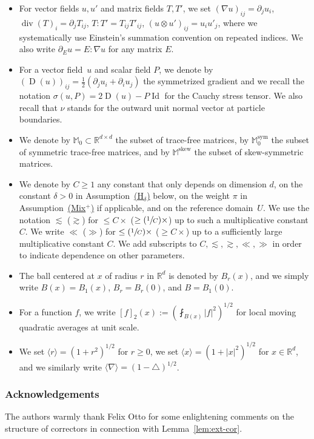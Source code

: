 \documentclass[JEP,XML,SOM,Unicode,published]{cedram}
\newcommand{\Hd}{\hyperref[Hd]{\textup{(H$_\delta$)}}\xspace}
\newcommand{\Mix}{\hyperref[Mix+]{\textup{(Mix$^+$)}}\xspace}
\newcommand{\Psfrac}[2]{(\sfrac{#1}{#2})}
\theoremstyle{plain}
\theoremstyle{definition}
\newcommand{\R}{\mathbb R}
\newcommand{\Md}{\mathbb M}
\newcommand{\Id}{\operatorname{Id}}
\newcommand{\D}{\operatorname{D}}
\newcommand{\Div}{{\operatorname{div}}}
\newcommand{\Sym}{{\operatorname{sym}}}
\newcommand{\Skew}{{\operatorname{skew}}}
\begin{document}
\begin{itemize}
\item For vector fields $u,u'$ and matrix fields $T,T'$, we set $(\nabla u)_{ij}=\partial_ju_i$, $\Div( T)_i=\partial_jT_{ij}$, $T\!\!:\!\!T'=T_{ij}T'_{ij}$, $(u\otimes u')_{ij}=u_iu'_j$, where we systematically use Einstein's summation convention on repeated indices. We also write {$\partial_Eu=E:\nabla u$} for any matrix $E$.
\item For a vector field~$u$ and scalar field $P$, we denote by $(\D(u))_{ij}=\frac12(\partial_ju_i+\partial_iu_j)$ the symmetrized gradient and we recall the notation $\sigma(u,P)=2\D(u)-P\Id$ for the Cauchy stress tensor. We also recall that $\nu$ stands for the outward unit normal vector at particle boundaries.
\item We denote by $\Md_0\subset\R^{d\times d}$ the subset of trace-free matrices, by $\Md_0^\Sym$ the subset of symmetric trace-free matrices, and by $\Md^\Skew$ the subset of skew-symmetric matrices.
\item We denote by $C\ge1$ any constant that only depends on dimension $d$, on the constant $\delta>0$ in Assumption~\Hd below, on the weight $\pi$ in Assumption~\Mix if applicable, and on the reference domain~$U$. We use the notation $\lesssim$ (\resp $\gtrsim$) for $\le C\times$ (\resp \mbox{$\ge\Psfrac1C\times$}) up to such a multiplicative constant $C$. We write $\ll$ (\resp $\gg$) for $\le \Psfrac1C\times$ (\resp \mbox{$\ge C\times$}) up to a sufficiently large multiplicative constant $C$.
We add subscripts to $C,\lesssim,\gtrsim,\ll,\gg$ in order to indicate dependence on other parameters.
\item The ball centered at $x$ of radius $r$ in $\R^d$ is denoted by $B_r(x)$, and we simply write $B(x)=B_1(x)$, $B_r=B_r(0)$, and $B=B_1(0)$.
\item For a function $f$, we write $[f]_2(x):=(\fint_{B(x)}|f|^2)^{1/2}$ for local moving quadratic averages at unit scale.
\item We set $\langle r \rangle =(1+r^2)^{1/2}$ for $r \ge 0$, we set $\langle x\rangle=(1+|x|^2)^{1/2}$ for $x\in\R^d$, and we similarly write $\langle\nabla\rangle=(1-\triangle)^{1/2}$.
\end{itemize}

\subsubsection*{Acknowledgements}
The authors warmly thank Felix Otto for some enlightening comments on the structure of correctors in connection with Lemma~\ref{lem:ext-cor}.
\end{document}
